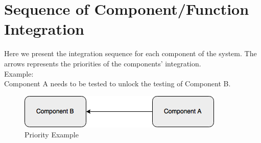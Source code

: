 \documentclass[../../../../testPlan.tex]{subfiles}
\begin{document}
	\section{Sequence of Component/Function Integration}
		Here we present the integration sequence for each component of the system.
		The arrows represents the priorities of the components' integration.\\
		Example:\\
		Component A needs to be tested to unlock the testing of Component B.

		\begin{figure}[H]
				\centering
				\includegraphics[width=\textwidth, scale=0.5]{../images/priority_example.png}
			\caption{Priority Example}\label{fig:PriorityExample}
		\end{figure}

		

		
\end{document}
